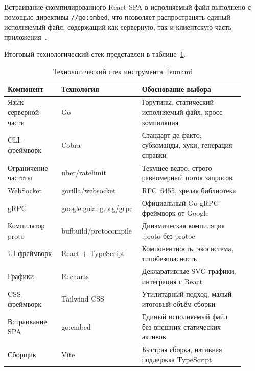 Встраивание скомпилированного React SPA в исполняемый файл выполнено с помощью
директивы \texttt{//go:embed}, что позволяет распространять единый исполняемый файл,
содержащий как серверную, так и клиентскую часть приложения~\cite{gospec}.

Итоговый технологический стек представлен в таблице~\ref{tab:ch1-stack}.

\begin{table}[h!]
  \centering
  \caption{Технологический стек инструмента Tsunami}
  \label{tab:ch1-stack}
  \small
  \begin{tabular}{|p{0.22\linewidth}|p{0.28\linewidth}|p{0.42\linewidth}|}
    \hline
    \textbf{Компонент} & \textbf{Технология} & \textbf{Обоснование выбора} \\
    \hline
    Язык серверной части & Go                           & Горутины, статический исполняемый файл, кросс-компиляция \\
    \hline
    CLI-фреймворк    & Cobra                        & Стандарт де-факто; субкоманды, хуки, генерация справки \\
    \hline
    Ограничение частоты & uber/ratelimit                & Текущее ведро; строго равномерный поток запросов \\
    \hline
    WebSocket        & gorilla/websocket            & RFC~6455, зрелая библиотека \\
    \hline
    gRPC             & google.golang.org/grpc       & Официальный Go gRPC-фреймворк от Google \\
    \hline
    Компилятор proto & bufbuild/protocompile        & Динамическая компиляция .proto без protoc \\
    \hline
    UI-фреймворк     & React + TypeScript           & Компонентность, экосистема, типобезопасность \\
    \hline
    Графики          & Recharts                     & Декларативные SVG-графики, интеграция с React \\
    \hline
    CSS-фреймворк    & Tailwind CSS                 & Утилитарный подход, малый итоговый объём сборки \\
    \hline
    Встраивание SPA  & go:embed                     & Единый исполняемый файл без внешних статических активов \\
    \hline
    Сборщик          & Vite                         & Быстрая сборка, нативная поддержка TypeScript \\
    \hline
  \end{tabular}
\end{table}


